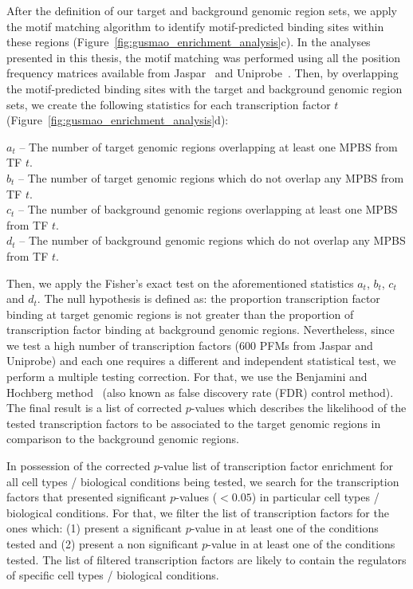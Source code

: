 After the definition of our target and background genomic region sets, we apply the motif matching algorithm to identify motif-predicted binding sites within these regions (Figure~\ref{fig:gusmao_enrichment_analysis}c). In the analyses presented in this thesis, the motif matching was performed using all the position frequency matrices available from Jaspar~\cite{mathelier2014} and Uniprobe~\cite{robasky2011}. Then, by overlapping the motif-predicted binding sites with the target and background genomic region sets, we create the following statistics for each transcription factor $t$ (Figure~\ref{fig:gusmao_enrichment_analysis}d):

\vspace{0.3cm}
\noindent
$a_t$ -- The number of target genomic regions overlapping at least one MPBS from TF $t$. \vspace{0.2cm} \\
$b_t$ -- The number of target genomic regions which do not overlap any MPBS from TF $t$. \vspace{0.2cm} \\
$c_t$ -- The number of background genomic regions overlapping at least one MPBS from TF $t$. \vspace{0.2cm} \\
$d_t$ -- The number of background genomic regions which do not overlap any MPBS from TF $t$.\\
\vspace{0.3cm}

Then, we apply the Fisher's exact test on the aforementioned statistics $a_t$, $b_t$, $c_t$ and $d_t$. The null hypothesis is defined as: the proportion transcription factor binding at target genomic regions is not greater than the proportion of transcription factor binding at background genomic regions. Nevertheless, since we test a high number of transcription factors (\approxy$600$ PFMs from Jaspar and Uniprobe) and each one requires a different and independent statistical test, we perform a multiple testing correction. For that, we use the Benjamini and Hochberg method~\cite{benjamini1995} (also known as false discovery rate (FDR) control method). The final result is a list of corrected $p$-values which describes the likelihood of the tested transcription factors to be associated to the target genomic regions in comparison to the background genomic regions.

In possession of the corrected $p$-value list of transcription factor enrichment for all cell types / biological conditions being tested, we search for the transcription factors that presented significant $p$-values ($< 0.05$) in particular cell types / biological conditions. For that, we filter the list of transcription factors for the ones which: (1) present a significant $p$-value in at least one of the conditions tested and (2) present a non significant $p$-value in at least one of the conditions tested. The list of filtered transcription factors are likely to contain the regulators of specific cell types / biological conditions.

